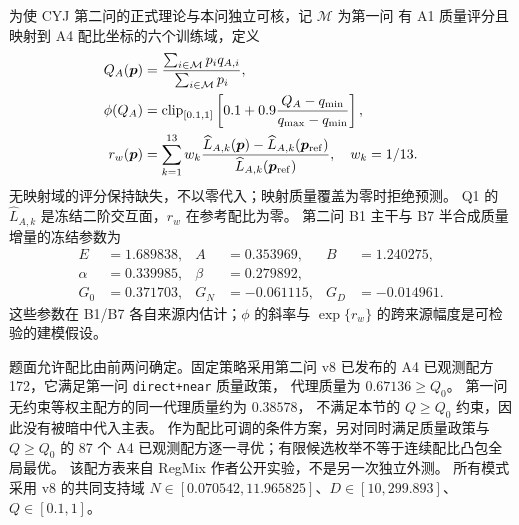 为使 CYJ 第二问的正式理论与本问独立可核，记 $\mathcal M$ 为第一问
有 A1 质量评分且映射到 A4 配比坐标的六个训练域，定义
\begin{equation}
\begin{aligned}
Q_A(\boldsymbol p)&=
\frac{\sum_{i\in\mathcal M}p_iq_{A,i}}{\sum_{i\in\mathcal M}p_i},\\
\phi(Q_A)&=\operatorname{clip}_{[0.1,1]}
\left[0.1+0.9\frac{Q_A-q_{\min}}{q_{\max}-q_{\min}}\right],\\
r_w(\boldsymbol p)&=\sum_{k=1}^{13}w_k
\frac{\widehat L_{A,k}(\boldsymbol p)-
\widehat L_{A,k}(\boldsymbol p_{\rm ref})}
{\widehat L_{A,k}(\boldsymbol p_{\rm ref})},\quad w_k=1/13.
\end{aligned}
\label{eq:q3_v8_bridges}
\end{equation}
无映射域的评分保持缺失，不以零代入；映射质量覆盖为零时拒绝预测。
Q1 的 $\widehat L_{A,k}$ 是冻结二阶交互面，$r_w$ 在参考配比为零。
第二问 B1 主干与 B7 半合成质量增量的冻结参数为
\begin{equation*}
\begin{aligned}
E&=1.689838,& A&=0.353969,& B&=1.240275,\\
\alpha&=0.339985,&\beta&=0.279892,\\
G_0&=0.371703,&G_N&=-0.061115,&G_D&=-0.014961.
\end{aligned}
\end{equation*}
这些参数在 B1/B7 各自来源内估计；$\phi$ 的斜率与
$\exp\{r_w\}$ 的跨来源幅度是可检验的建模假设。

题面允许配比由前两问确定。固定策略采用第二问 v8 已发布的
A4 已观测配方 172，它满足第一问 \texttt{direct+near} 质量政策，
代理质量为 $0.67136\ge Q_0$。
第一问无约束等权主配方的同一代理质量约为 $0.38578$，
不满足本节的 $Q\ge Q_0$ 约束，因此没有被暗中代入主表。
作为配比可调的条件方案，另对同时满足质量政策与 $Q\ge Q_0$ 的 87 个 A4
已观测配方逐一寻优；有限候选枚举不等于连续配比凸包全局最优。
该配方表来自 RegMix 作者公开实验\cite{regmix2025}，不是另一次独立外测。
所有模式采用 v8 的共同支持域
$N\in[0.070542,11.965825]$、$D\in[10,299.893]$、$Q\in[0.1,1]$。

